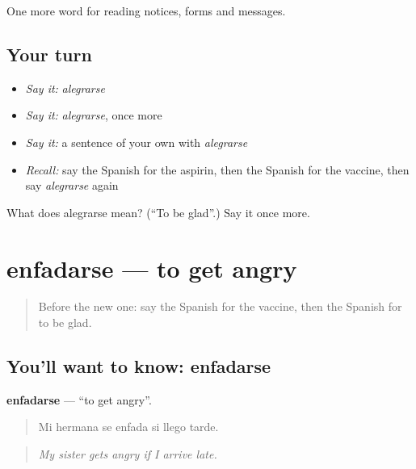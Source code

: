 \begin{grammarlens}[title={What you've built}]
One more word for reading notices, forms and messages.
\end{grammarlens}

\subsection*{Your turn}
\begin{itemize}
\raggedright
  \item \emph{Say it:} \emph{alegrarse}
  \item \emph{Say it:} \emph{alegrarse}, once more
  \item \emph{Say it:} a sentence of your own with \emph{alegrarse}
  \item \emph{Recall:} say the Spanish for the aspirin, then the Spanish for the vaccine, then say \emph{alegrarse} again
\end{itemize}

\begin{tcolorbox}[breakable,colback=teal!4,colframe=teal!35!black,title={Before you move on}]
What does alegrarse mean? (\textquotedblleft{}To be glad\textquotedblright{}.) Say it once more.
\end{tcolorbox}
\section[enfadarse]{enfadarse — to get angry}

\label{lesson:ES-C487-enfadarse}



\begin{quote}
Before the new one: say the Spanish for the vaccine, then the Spanish for to be glad.
\end{quote}

\subsection*{You'll want to know: enfadarse}
\textbf{enfadarse} — \textquotedblleft{}to get angry\textquotedblright{}.

\begin{quote}
Mi hermana se enfada si llego tarde.
\end{quote}

\begin{quote}
\emph{My sister gets angry if I arrive late.}
\end{quote}

